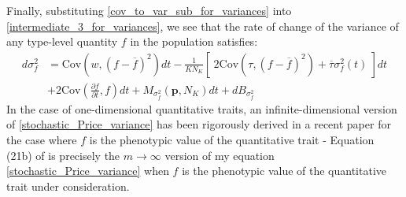 Finally, substituting \eqref{cov_to_var_sub_for_variances} into \eqref{intermediate_3_for_variances}, we see that the rate of change of the variance of any type-level quantity $f$ in the population satisfies:
\begin{equation}
\label{stochastic_Price_variance}
\begin{aligned}
d\sigma^2_{f} &= \textrm{Cov}\left(w,(f - \overline{f})^2\right)dt - \frac{1}{KN_K}\left[ \ 2\textrm{Cov}\left(\tau,(f - \overline{f})^2\right) + \overline{\tau}\sigma^2_{f}(t) \ \right]dt\\[12pt]
& + 2\textrm{Cov}\left(\frac{\partial f}{\partial t},f\right)dt + M_{\sigma^2_f}(\mathbf{p},N_K)dt + dB_{\sigma^2_{f}}
\end{aligned}
\end{equation}
In the case of one-dimensional quantitative traits, an infinite-dimensional version of \eqref{stochastic_Price_variance} has been rigorously derived \citep{week_white_2021} in a recent paper for the case where $f$ is the phenotypic value of the quantitative trait - Equation (21b) of \cite{week_white_2021} is precisely the $m \to \infty$ version of my equation \eqref{stochastic_Price_variance} when $f$ is the phenotypic value of the quantitative trait under consideration.